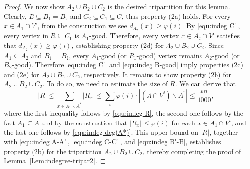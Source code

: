 \documentclass[10pt,a4paper]{amsart}
\begin{document}
\begin{proof}
		We now show $A_2\cup B_2\cup C_2$ is the desired tripartition for this lemma.
		Clearly, $B\subseteq B_1=B_2$ and $C_2\subseteq C_1\subseteq C$, thus property (2a) holds.
		For every $x\in A_1\cap V^i$, from the construction we see $d_{A_2}(x)\geq \varphi(i)$.
		By \eqref{equ:indeg C'}, every vertex in $R\subseteq C_1$ is $A_1$-good.
		Therefore, every vertex $x\in A_2\cap V^i$ satisfies that $d_{A_2}(x)\ge \varphi(i)$,
		establishing property (2d) for $A_2\cup B_2\cup C_2$.
		Since $A_1\subseteq A_2$ and $B_1=B_2$,
		every $A_1$-good (or $B_1$-good) vertex remains $A_2$-good (or $B_2$-good).
		Therefore \eqref{equ:indeg C'} and \eqref{equ:indeg B-good} imply properties (2c) and (2e) for $A_2\cup B_2\cup C_2$, respectively.
		It remains to show property (2b) for $A_2\cup B_2\cup C_2$.
		To do so, we need to estimate the size of $R$.
		We can derive that
		$$|R|\le \sum_{x\in A_1\backslash A^*} |R_x|\le \sum_{i} \varphi(i)\cdot |(A\cap V^i)\backslash A^*|\le \frac{\varepsilon n}{1000},$$
		where the first inequality follows by \eqref{equ:indeg R}, the second one follows by the fact $A_1\subseteq A$ and by the construction that $|R_x|\leq \varphi(i)$ for each $x\in A_1\cap V^i$,
		and the last one follows by \eqref{equ:indeg deg(A*)}.
		This upper bound on $|R|$, together with \eqref{equ:indeg A-A'}, \eqref{equ:indeg C-C'}, and \eqref{equ:indeg B'-B},
		establishes property (2b) for the tripartition $A_2 \cup B_2 \cup C_2$, thereby completing the proof of Lemma~\ref{Lem:indegree-tripar2}.
	\end{proof}
\end{document}
